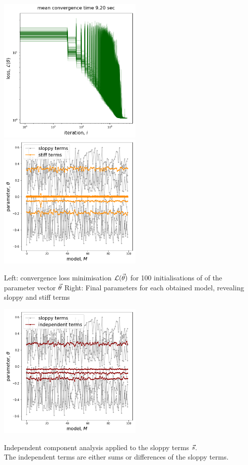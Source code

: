 \begin{Figure}
\includegraphics[width=70mm]{figures/convergence.png}
\includegraphics[width=70mm]{figures/parameters.png}
\caption{Left: convergence loss minimisation $\mathcal{L}(\vec{\theta})$ for 100 initialisations of
of the parameter vector $\vec{\theta}$ Right: Final parameters for each obtained model,
revealing sloppy and stiff terms}
\label{fig:convergence}
\end{Figure}

\begin{Figure}
\includegraphics[width=70mm]{figures/indepedent.png}
\caption{Independent component analysis applied to the sloppy terms $\vec{s}$.\\
The independent terms are either sums or differences of the sloppy terms.}
\label{fig:indepedent}
\end{Figure}
\newpage
